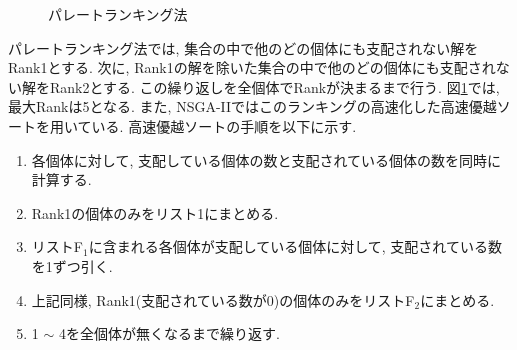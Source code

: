 \documentclass[11pt,a4j,notitlepage]{jreport}
\begin{document}
\begin{figure}[htbp]
  \begin{center}

                \setlength{\abovecaptionskip}{0mm}
    \setlength{\belowcaptionskip}{0mm}
      \caption{パレートランキング法}
  \label{fig:ranking}
  \end{center}
\end{figure}

\vspace{3mm}
パレートランキング法では, 集合の中で他のどの個体にも支配されない解をRank1とする.
次に, Rank1の解を除いた集合の中で他のどの個体にも支配されない解をRank2とする.
この繰り返しを全個体でRankが決まるまで行う.
図\ref{fig:ranking}では, 最大Rankは5となる.
また, NSGA-IIではこのランキングの高速化した高速優越ソートを用いている.
高速優越ソートの手順を以下に示す.


\begin{enumerate}
\item 各個体に対して, 支配している個体の数と支配されている個体の数を同時に計算する.
\item Rank1の個体のみをリスト1にまとめる.
\item リストF$_1$に含まれる各個体が支配している個体に対して, 支配されている数を1ずつ引く.
\item 上記同様, Rank1(支配されている数が0)の個体のみをリストF$_2$にまとめる.
\item 1 $\sim$ 4を全個体が無くなるまで繰り返す.
\end{enumerate}
\end{document}
